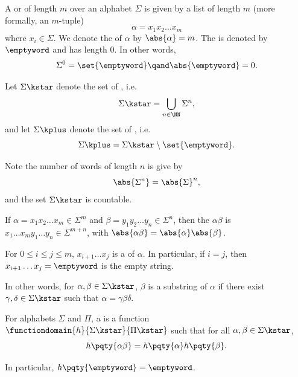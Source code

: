 \begin{definition}
    A  or  of length \(m\) over an alphabet \(\Sigma\) is given by a list of length \(m\) (more formally, an \(m\)-tuple)
    \[
        \alpha = x_1 x_2 \ldots x_m
    \]
    where \(x_i \in \Sigma\). We denote the  of \(\alpha\) by \(\abs{\alpha} = m\). The  is denoted by \(\emptyword\) and has length \(0\). In other words,
    \[
        \Sigma^0 = \set{\emptyword} \qand \abs{\emptyword} = 0.
    \]

    Let \(\Sigma\kstar\) denote the set of , i.e.
    \[
        \Sigma\kstar = \bigcup_{n \in \NN} \Sigma^n,
    \]
    and let \(\Sigma\kplus\) denote the set of , i.e.
    \[
        \Sigma\kplus = \Sigma\kstar \setminus \set{\emptyword}.
    \]
\end{definition}

\begin{remark}
    Note the number of words of length \(n\) is give by
    \[
        \abs{\Sigma^n} = \abs{\Sigma}^n,
    \]
    and the set \(\Sigma\kstar\) is countable.
\end{remark}

\begin{definition}
    If \(\alpha = x_1 x_2 \ldots x_m \in \Sigma^m\) and \(\beta = y_1 y_2 \ldots y_n \in \Sigma^n\), then the  \(\alpha \beta\) is \(x_1 \ldots x_m y_1 \ldots y_n \in \Sigma^{m + n}\), with \(\abs{\alpha \beta} = \abs{\alpha}\abs{\beta}\).

    For \(0 \leq i \leq j \leq m\), \(x_{i + 1} \ldots x_j\) is a  of \(\alpha\). In particular, if \(i = j\), then \(x_{i + 1} \ldots x_j = \emptyword\) is the empty string.
\end{definition}

\begin{remark}
    In other words, for \(\alpha, \beta \in \Sigma\kstar\), \(\beta\) is a substring of \(\alpha\) if there exist \(\gamma, \delta \in \Sigma\kstar\) such that \(\alpha = \gamma \beta \delta\).
\end{remark}

\begin{definition}[Homomorphism]
    For alphabets \(\Sigma\) and \(\Pi\), a  is a function \(\functiondomain{h}{\Sigma\kstar}{\Pi\kstar}\) such that for all \(\alpha, \beta \in \Sigma\kstar\),
    \[
        h\pqty{\alpha \beta} = h\pqty{\alpha} h\pqty{\beta}.
    \]

    In particular, \(h\pqty{\emptyword} = \emptyword\).
\end{definition}

